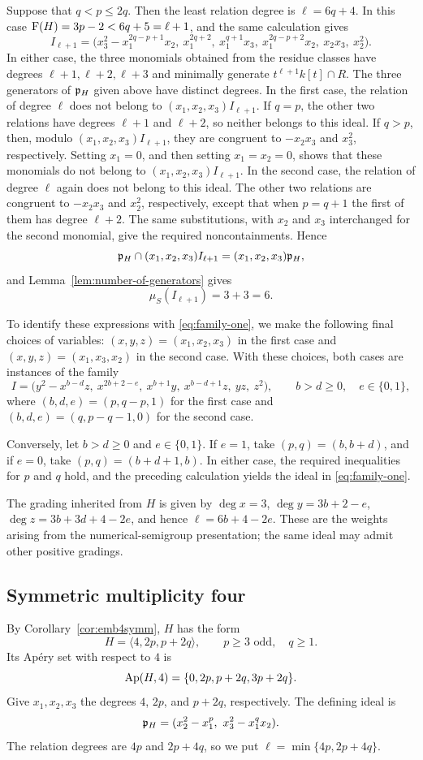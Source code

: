 Suppose that $q<p \le 2q$. Then the least relation degree is $\ell = 6q+4$.
In this case $\operatorname{F}(H)=3p-2<6q+5 = \ell + 1$, and the same calculation gives
\[
 I_{\ell + 1} =\bigl(x_3^2-x_1^{2q-p+1}x_2,\ x_1^{2q+2},\ x_1^{q+1}x_3,\
             x_1^{2q-p+2}x_2,\ x_2x_3,\ x_2^2\bigr).
\]
In either case, the three monomials obtained from the residue classes have
degrees $\ell+1,\ell+2,\ell+3$ and minimally generate
$t^{\ell+1}k[t]\cap R$.  The three generators of $\mathfrak{p}_H$ given above have
distinct degrees.  In the first case, the relation of degree $\ell$
does not belong to $(x_1,x_2,x_3)I_{\ell+1}$.  If $q=p$, the other two
relations have degrees $\ell+1$ and $\ell+2$, so neither belongs to this
ideal.  If $q>p$, then, modulo $(x_1,x_2,x_3)I_{\ell+1}$, they are congruent
to $-x_2x_3$ and $x_3^2$, respectively.  Setting $x_1=0$, and then setting
$x_1=x_2=0$, shows that these monomials do not belong to
$(x_1,x_2,x_3)I_{\ell+1}$.  In the second case, the relation of degree
$\ell$ again does not belong to this ideal.  The other two relations are
congruent to $-x_2x_3$ and $x_2^2$, respectively, except that when $p=q+1$
the first of them has degree $\ell+2$.  The same substitutions, with $x_2$
and $x_3$ interchanged for the second monomial, give the required
noncontainments.  Hence
\[
 \mathfrak{p}_H\cap(x_1,x_2,x_3)I_{\ell+1}=(x_1,x_2,x_3)\mathfrak{p}_H,
\]
and Lemma~\ref{lem:number-of-generators} gives
\[
 \mu_S(I_{\ell+1})=3+3=6.
\]

To identify these expressions with \eqref{eq:family-one}, we make
the following final choices of variables: $(x,y,z)=(x_1,x_2,x_3)$ in the
first case and $(x,y,z)=(x_1,x_3,x_2)$ in the second case.  With these
choices, both cases are instances of the family
\[
 I=\bigl(y^2-x^{b-d}z,\ x^{2b+2-e},\ x^{b+1}y,\
             x^{b-d+1}z,\ yz,\ z^2\bigr),
 \qquad b>d\geq0,\quad e\in\{0,1\},
\]
where $(b,d,e)=(p,q-p,1)$ for the first case and $(b,d,e)=(q,p-q-1,0)$ for the second case.

Conversely, let $b>d\geq0$ and $e\in\{0,1\}$.  If $e=1$, take
$(p,q)=(b,b+d)$, and if $e=0$, take $(p,q)=(b+d+1,b)$.  In either case,
the required inequalities for $p$ and $q$ hold, and the preceding calculation yields the
ideal in \eqref{eq:family-one}.

The grading inherited from $H$ is given by
$\deg x = 3$, $\deg y = 3b+2-e$, $\deg z = 3b+3d+4-2e$, and hence
$\ell=6b+4-2e$.
These are the weights arising from the numerical-semigroup presentation; the same ideal may admit other positive gradings.

\subsection{Symmetric multiplicity four}
\label{subsec:symmetric-multiplicity-four}
By Corollary~\ref{cor:emb4symm}, $H$ has the form
\[
 H=\langle4,2p,p+2q\rangle,
 \qquad p\geq3\text{ odd},\quad q\geq1.
\]
Its Ap\'ery set with respect to $4$ is
\[
 \operatorname{Ap}(H,4)=\{0,2p,p+2q,3p+2q\}.
\]
Give $x_1,x_2,x_3$ the degrees $4$, $2p$, and $p+2q$, respectively.  The
defining ideal is
\[
 \mathfrak{p}_H=(x_2^2-x_1^p,\ x_3^2-x_1^qx_2).
\]
The relation degrees are $4p$ and $2p+4q$, so we put $\ell = \min\{4p, 2p+4q\}$.

